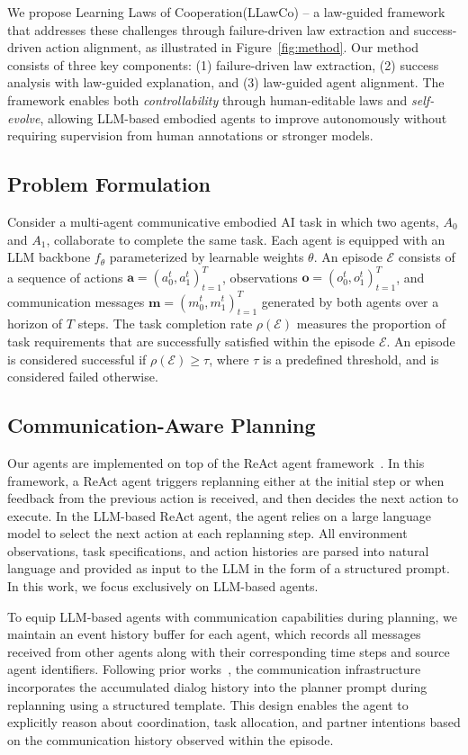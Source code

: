 \documentclass{article}
\theoremstyle{plain}
\theoremstyle{definition}
\theoremstyle{remark}
\newcommand{\fullname}{Learning Laws of Cooperation\xspace}
\newcommand{\name}{LLawCo\xspace}
\begin{document}
We propose \fullname (\name) -- a law-guided framework that addresses these challenges through failure-driven law extraction and success-driven action alignment, as illustrated in Figure~\ref{fig:method}. Our method consists of three key components: (1) failure-driven law extraction, (2) success analysis with law-guided explanation, and (3) law-guided agent alignment. The framework enables both \textit{controllability} through human-editable laws and \textit{self-evolve}, allowing LLM-based embodied agents to improve autonomously without requiring supervision from human annotations or stronger models.

\subsection{Problem Formulation}
Consider a multi-agent communicative embodied AI task in which two agents, $A_0$ and $A_1$, collaborate to complete the same task. Each agent is equipped with an LLM backbone $f_{\theta}$ parameterized by learnable weights $\theta$. An episode $\mathcal{E}$ consists of a sequence of actions $\mathbf{a} = (a_0^t, a_1^t)_{t=1}^T$, observations $\mathbf{o} = (o_0^t, o_1^t)_{t=1}^T$, and communication messages $\mathbf{m} = (m_0^t, m_1^t)_{t=1}^T$ generated by both agents over a horizon of $T$ steps. The task completion rate $\rho(\mathcal{E})$ measures the proportion of task requirements that are successfully satisfied within the episode $\mathcal{E}$. An episode is considered successful if $\rho(\mathcal{E}) \geq \tau$, where $\tau$ is a predefined threshold, and is considered failed otherwise.

\subsection{Communication-Aware Planning}
Our agents are implemented on top of the ReAct agent framework~\cite{yao2022react, partnr}. In this framework, a ReAct agent triggers replanning either at the initial step or when feedback from the previous action is received, and then decides the next action to execute. In the LLM-based ReAct agent, the agent relies on a large language model to select the next action at each replanning step. All environment observations, task specifications, and action histories are parsed into natural language and provided as input to the LLM in the form of a structured prompt. In this work, we focus exclusively on LLM-based agents.

To equip LLM-based agents with communication capabilities during planning, we maintain an event history buffer for each agent, which records all messages received from other agents along with their corresponding time steps and source agent identifiers. Following prior works~\cite{coela, comm-partnr}, the communication infrastructure incorporates the accumulated dialog history into the planner prompt during replanning using a structured template. This design enables the agent to explicitly reason about coordination, task allocation, and partner intentions based on the communication history observed within the episode.
\end{document}
